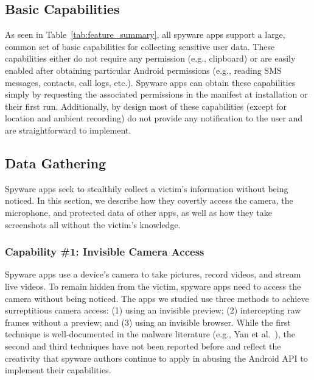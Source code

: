 \subsection{Basic Capabilities}
\label{subsec:features_enabled_by_permission}
As seen in Table~\ref{tab:feature_summary}, all spyware apps support a large, common set of basic capabilities for collecting sensitive user data.
These capabilities either do not require any permission (e.g., clipboard) or are easily enabled after obtaining particular Android permissions (e.g., reading SMS messages, contacts, call logs, etc.). Spyware apps can obtain these capabilities simply by
requesting the associated permissions in the manifest at installation or their first run.
Additionally, by design most of these capabilities
(except for location and ambient recording) do not provide any notification to
the user and are straightforward to implement.


\subsection{Data Gathering}
\label{subsec:data_gathering}
Spyware apps seek to stealthily collect a victim's information without being noticed. In this section, we describe how they covertly access the camera, the microphone, and protected data of other apps, as well as how they take screenshots all without the victim's knowledge.

\subsubsection*{Capability \#1: Invisible Camera Access}
\label{subsubsec:invisible_cam}
Spyware apps use a device's camera to take pictures, record videos, and stream live
videos. To remain hidden from the victim, spyware apps need to access the camera
without being noticed. The apps we studied use three methods to achieve
surreptitious camera access: (1) using an invisible preview; (2) intercepting raw
frames without a preview; and (3) using an invisible browser.
While the first technique is well-documented in the malware literature (e.g., Yan et al.~\cite{yan2019understanding}), the second and third techniques
have not been reported before and reflect
the creativity that spyware authors continue to apply in
abusing the Android API to implement their capabilities.



